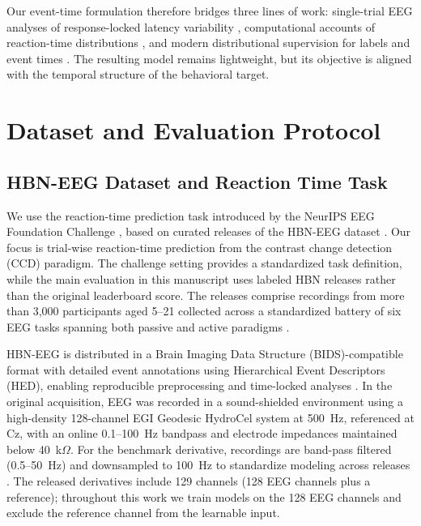 \documentclass[12pt]{article}
\begin{document}
Our event-time formulation therefore bridges three lines of work: single-trial EEG
analyses of response-locked latency variability
\citep{Jung1998SingleTrialERP,Ouyang2017LatencyReview}, computational accounts of
reaction-time distributions
\citep{Ratcliff2008Diffusion,OConnell2012Supramodal,Kelly2013Internal}, and modern
distributional supervision for labels and event times
\citep{Geng2016LabelDistributionLearning,Lee2018DeepHit,Chapfuwa2023Calibration,Haider2020SurvivalDistributions}.
The resulting model remains lightweight, but its objective is aligned with the temporal
structure of the behavioral target.


\section{Dataset and Evaluation Protocol}

\subsection{HBN-EEG Dataset and Reaction Time Task}

We use the reaction-time prediction task introduced by the NeurIPS EEG Foundation Challenge \citep{EEGChallengeWebsite2025,EEGFoundationChallengeArxiv2025}, based on curated releases of the HBN-EEG dataset \citep{Shirazi2024HBNEEG}. Our focus is trial-wise reaction-time prediction from the contrast change detection (CCD) paradigm. The challenge setting provides a standardized task definition, while the main evaluation in this manuscript uses labeled HBN releases rather than the original leaderboard score. The releases comprise recordings from more than 3{,}000 participants aged 5--21 collected across a standardized battery of six EEG tasks spanning both passive and active paradigms \citep{Shirazi2024HBNEEG,EEGChallengeWebsite2025}.

HBN-EEG is distributed in a Brain Imaging Data Structure (BIDS)-compatible format with detailed event annotations using Hierarchical Event Descriptors (HED), enabling reproducible preprocessing and time-locked analyses \citep{Shirazi2024HBNEEG}. In the original acquisition, EEG was recorded in a sound-shielded environment using a high-density 128-channel EGI Geodesic HydroCel system at 500~Hz, referenced at Cz, with an online 0.1--100~Hz bandpass and electrode impedances maintained below 40~k$\Omega$. For the benchmark derivative, recordings are band-pass filtered (0.5--50~Hz) and downsampled to 100~Hz to standardize modeling across releases \citep{EEGChallengeWebsite2025}. The released derivatives include 129 channels (128 EEG channels plus a reference); throughout this work we train models on the 128 EEG channels and exclude the reference channel from the learnable input.
\end{document}
